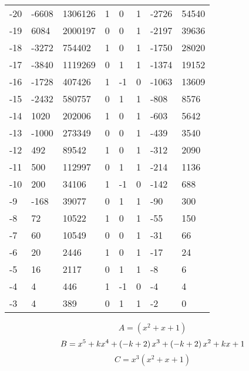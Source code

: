 \documentclass{amsart}
\begin{document}
\begin{longtable}{|l|l|l|lllll|}
-20&-6608&1306126&1&0&1&-2726&54540\\
-19&6084&2000197&0&0&1&-2197&39636\\
-18&-3272&754402&1&0&1&-1750&28020\\
-17&-3840&1119269&0&1&1&-1374&19152\\
-16&-1728&407426&1&-1&0&-1063&13609\\
-15&-2432&580757&0&1&1&-808&8576\\
-14&1020&202006&1&0&1&-603&5642\\
-13&-1000&273349&0&0&1&-439&3540\\
-12&492&89542&1&0&1&-312&2090\\
-11&500&112997&0&1&1&-214&1136\\
-10&200&34106&1&-1&0&-142&688\\
-9&-168&39077&0&1&1&-90&300\\
-8&72&10522&1&0&1&-55&150\\
-7&60&10549&0&0&1&-31&66\\
-6&20&2446&1&0&1&-17&24\\
-5&16&2117&0&1&1&-8&6\\
-4&4&446&1&-1&0&-4&4\\
-3&4&389&0&1&1&-2&0\\
\hline
\end{longtable}
$$A=(x^2
 + x
 + 1)$$
$$B=x^5
 + k\*x^4
 + \left(-k
 + 2\right) \*x^3
 + \left(-k
 + 2\right) \*x^2
 + k\*x
 + 1$$
$$C=x^3(x^2
 + x
 + 1)$$
\end{document}
